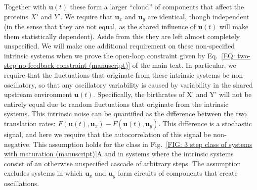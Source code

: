\documentclass[%
 reprint,prx,
superscriptaddress,
%
%
%
%
%
%
%
%
%
 amsmath,amssymb,
 aps,
%
%
%
%
%
%
]{revtex4-2}
\begin{document}
Together with $\mathbf{u}(t)$ these form a larger ``cloud'' of 
components that affect the proteins $X'$ and $Y'$. We require that $\mathbf{u}_x$ and  $\mathbf{u}_y$ are identical, though independent {(in the sense that they are not equal, as the shared influence of $\mathbf{u}(t)$ will make them statistically dependent)}.  Aside from this they are left almost completely 
unspecified. We will make one additional requirement on these non-specified intrinsic systems when we prove the open-loop constraint given by Eq.~\eqref{EQ: two-step no-feedback constraint (manuscript)} of the main text.
In particular, we require that the fluctuations that originate from these intrinsic systems be non-oscillatory, {so that any oscillatory variability is caused by variability in the shared upstream environment $\mathbf{u}(t)$.}
Specifically, the birthrates of X' and Y' will not be entirely equal due to random fluctuations that originate from the intrinsic systems. This intrinsic noise can be quantified as the difference between the two translation rates: $F(\mathbf{u}(t), \mathbf{u}_x) - F(\mathbf{u}(t), \mathbf{u}_y)$. This difference is a stochastic signal, and here we require that the autocorrelation of this signal be non-negative. This assumption holds for the class in Fig.~\ref{FIG: 3 step class of systems with maturation (manuscript)}A
and in systems where the intrinsic systems consist of an otherwise unspecified cascade of arbitrary steps. The assumption excludes systems in which $\mathbf{u}_{x}$ and $\mathbf{u}_{y}$ form circuits of components that create oscillations.
 
\end{document}
